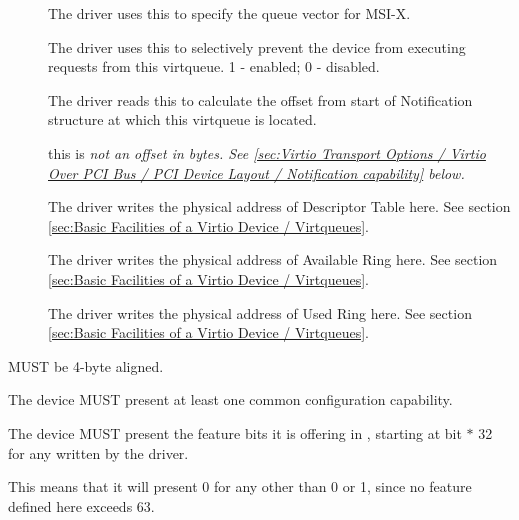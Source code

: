 \begin{description}
\item[]
        The driver uses this to specify the queue vector for MSI-X.

\item[]
        The driver uses this to selectively prevent the device from executing requests from this virtqueue.
        1 - enabled; 0 - disabled.

\item[]
        The driver reads this to calculate the offset from start of Notification structure at
        which this virtqueue is located.
        \begin{note} this is \em{not} an offset in bytes.
        See \ref{sec:Virtio Transport Options / Virtio Over PCI Bus / PCI Device Layout / Notification capability} below.
        \end{note}

\item[]
        The driver writes the physical address of Descriptor Table here.  See section \ref{sec:Basic Facilities of a Virtio Device / Virtqueues}.

\item[]
        The driver writes the physical address of Available Ring here.  See section \ref{sec:Basic Facilities of a Virtio Device / Virtqueues}.

\item[]
        The driver writes the physical address of Used Ring here.  See section \ref{sec:Basic Facilities of a Virtio Device / Virtqueues}.
\end{description}

 MUST be 4-byte aligned.

The device MUST present at least one common configuration capability.

The device MUST present the feature bits it is offering in , starting at bit  $*$ 32 for any  written by the driver.
\begin{note}
  This means that it will present 0 for any  other than 0 or 1, since no feature defined here exceeds 63.
\end{note}

